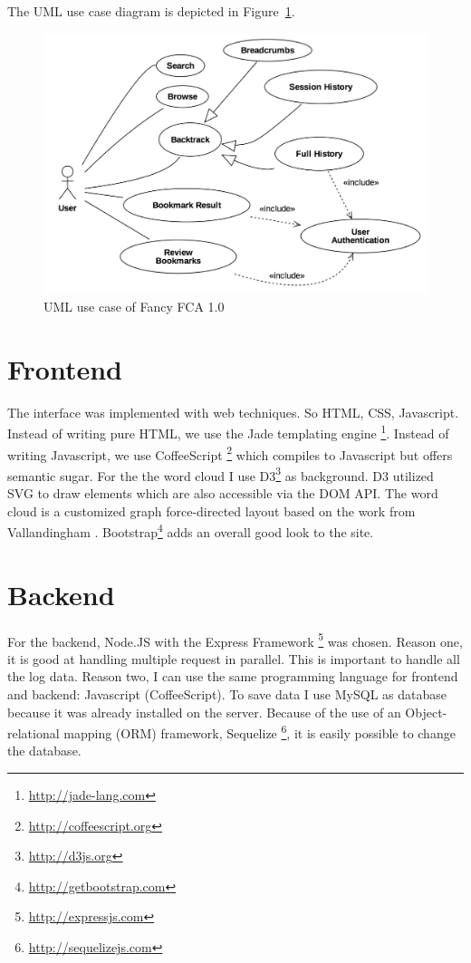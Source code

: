 \documentclass[11pt]{report}
\begin{document}
The UML use case diagram is depicted in Figure~\ref{figure:usecase}.

\begin{figure}[!ht]
	\centering
	\includegraphics[width=\linewidth]{images/usecase}
\caption{UML use case of Fancy FCA 1.0}
\label{figure:usecase}
\end{figure}

\section{Frontend}

The interface was implemented with web techniques. So HTML, CSS, Javascript. Instead of writing pure HTML, we use the Jade templating engine \footnote{\url{http://jade-lang.com}}. Instead of writing Javascript, we use CoffeeScript \footnote{\url{http://coffeescript.org}} which compiles to Javascript but offers semantic sugar. For the the word cloud I use D3\footnote{\url{http://d3js.org}} \cite{Bostock2011} as background. D3 utilized SVG to draw elements which are also accessible via the DOM API. The word cloud is a customized graph force-directed layout based on the work from Vallandingham \cite{Vallandingham}. Bootstrap\footnote{\url{http://getbootstrap.com}} adds an overall good look to the site.

\section{Backend}

For the backend, Node.JS with the Express Framework \footnote{\url{http://expressjs.com}} was chosen. Reason one, it is good at handling multiple request in parallel. This is important to handle all the log data. Reason two, I can use the same programming language for frontend and backend: Javascript (CoffeeScript). To save data I use MySQL as database because it was already installed on the server. Because of the use of an Object-relational mapping (ORM) framework, Sequelize \footnote{\url{http://sequelizejs.com}}, it is easily possible to change the database.
\end{document}
